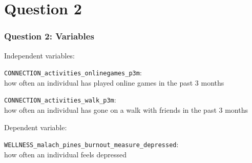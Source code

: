\documentclass{beamer}
\begin{document}

\section{Question 2}

\begin{frame}
    \frametitle{Question 2: Variables}
    
    Independent variables:
    
    \vspace{1em}
    
    {\small{\tt CONNECTION\_activities\_onlinegames\_p3m}:\\
    how often an individual has played online games in the past 3 months}
    
    \vspace{0.5em}
    
    {\small{\tt CONNECTION\_activities\_walk\_p3m}:\\
    how often an individual has gone on a walk with friends in the past 3 months}
    
    \vspace{1.5em}
    
    Dependent variable:

    \vspace{1em}
    
    {\small{\tt WELLNESS\_malach\_pines\_burnout\_measure\_depressed}:\\
    how often an individual feels depressed}
    
    
\end{frame}
\end{document}
